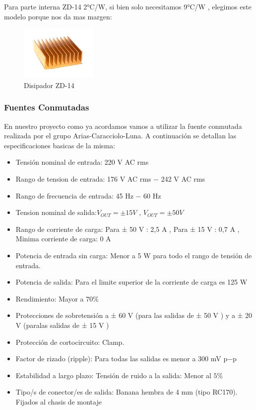 \documentclass[a4paper,12pt,twoside]{article}
\begin{document}
Para parte interna ZD-14 2°C/W, si bien solo necesitamos 9°C/W , elegimos este modelo porque nos da mas margen:

\begin{figure}[H]
    \centering
    \includegraphics[height=0.4\textwidth]{img/zd14.jpg}
    \caption{Disipador ZD-14}
    \label{fig:diszd14}
\end{figure}

\subsubsection{Fuentes Conmutadas}
\label{sec:fuente}

En nuestro proyecto como ya acordamos vamos a utilizar la fuente conmutada realizada por el grupo Arias-Caracciolo-Luna.
A continuación se detallan las especificaciones basicas de la misma:

\begin{itemize}
\item{Tensión nominal de entrada: 220 V AC rms}
\item{Rango de tension de entrada: 176 V AC rms − 242 V AC rms}
\item{Rango de frecuencia de entrada: 45 Hz − 60 Hz}
\item{Tension nominal de salida:$ V_{OUT} = ± 15 V$ , $V_{OUT} = ± 50 V$}
\item{Rango de corriente de carga: Para ± 50 V : 2,5 A , Para ± 15 V : 0,7 A , Minima corriente de carga: 0 A}
\item{Potencia de entrada sin carga: Menor a 5 W para todo el rango de tensión de entrada.}
\item{Potencia de salida: Para el limite superior de la corriente de carga es 125 W}
\item{Rendimiento: Mayor a $70\%$}
\item{Protecciones de sobretensión a ± 60 V (para las salidas de ± 50 V ) y a ± 20 V (paralas salidas de ± 15 V )}
\item{Protección de cortocircuito: Clamp.}
\item{Factor de rizado (ripple): Para todas las salidas es menor a 300 mV p−p}
\item{Estabilidad a largo plazo: Tensión de ruido a la salida: Menor al $5\%$}
\item{Tipo/s de conector/es de salida: Banana hembra de 4 mm  (tipo RC170). Fijados al chasis de montaje}
\end{itemize}
\end{document}
